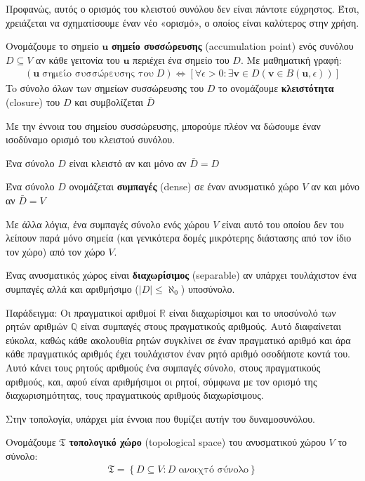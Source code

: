 \documentclass[main.tex]{subfiles}
\begin{document}
	Προφανώς, αυτός ο ορισμός του κλειστού συνόλου δεν είναι πάντοτε εύχρηστος. Έτσι, χρειάζεται να σχηματίσουμε έναν νέο «ορισμό», ο οποίος είναι καλύτερος στην χρήση.
	\begin{definition}
		Ονομάζουμε το σημείο $\boldsymbol{u}$ \textbf{σημείο συσσώρευσης} (accumulation point) ενός συνόλου ${D \subseteq V}$ αν κάθε γειτονία του $\boldsymbol{u}$ περιέχει ένα σημείο του $D$. Με μαθηματική γραφή:
		\begin{align*}
			(\boldsymbol{u}\;\text{σημείο συσσώρευσης του}\;D) \Leftrightarrow [\forall\epsilon>0:\exists\boldsymbol{v}\in D(\boldsymbol{v}\in B(\boldsymbol{u},\epsilon))]
		\end{align*}
		To σύνολο όλων των σημείων συσσώρευσης του $D$ το ονομάζουμε \textbf{κλειστότητα} (closure) του $D$ και συμβολίζεται $\bar{D}$
	\end{definition}
	Με την έννοια του σημείου συσσώρευσης, μπορούμε πλέον να δώσουμε έναν ισοδύναμο ορισμό του κλειστού συνόλου.
	\begin{theorem}
		Ένα σύνολο $D$ είναι κλειστό αν και μόνο αν $\bar{D} = D$
	\end{theorem}
	
	\begin{definition}
		Ένα σύνολο $D$ ονομάζεται \textbf{συμπαγές} (dense) σε έναν ανυσματικό χώρο $V$ αν και μόνο αν ${\bar{D} = V}$
	\end{definition}
	Με άλλα λόγια, ένα συμπαγές σύνολο ενός χώρου $V$ είναι αυτό του οποίου δεν του λείπουν παρά μόνο σημεία (και γενικότερα δομές μικρότερης διάστασης από τον ίδιο τον χώρο) από τον χώρο $V$.
	\begin{definition}
		Ένας ανυσματικός χώρος είναι \textbf{διαχωρίσιμος} (separable) αν υπάρχει τουλάχιστον ένα συμπαγές αλλά και αριθμήσιμο ($|D| \leq \aleph_0$) υποσύνολο.  
	\end{definition}
	Παράδειγμα: Οι πραγματικοί αριθμοί $\mathbb{R}$ είναι διαχωρίσιμοι και το υποσύνολό των ρητών αριθμών $\mathbb{Q}$ είναι συμπαγές στους πραγματικούς αριθμούς. Αυτό διαφαίνεται εύκολα, καθώς κάθε ακολουθία ρητών συγκλίνει σε έναν πραγματικό αριθμό και άρα κάθε πραγματικός αριθμός έχει τουλάχιστον έναν ρητό αριθμό οσοδήποτε κοντά του. Αυτό κάνει τους ρητούς αριθμούς ένα συμπαγές σύνολο, στους πραγματικούς αριθμούς, και, αφού είναι αριθμήσιμοι οι ρητοί, σύμφωνα με τον ορισμό της διαχωρισημότητας, τους πραγματικούς αριθμούς διαχωρίσιμους.
	
	\newpage
	Στην τοπολογία, υπάρχει μία έννοια που θυμίζει αυτήν του δυναμοσυνόλου.
	\begin{definition}
		Ονομάζουμε $\mathfrak{T}$ \textbf{τοπολογικό χώρο} (topological space) του ανυσματικού χώρου $V$ το σύνολο:
		\begin{align*}
			\mathfrak{T} = \left\{D\subseteq V : D \;\text{ανοιχτό σύνολο}\right\}
		\end{align*} 
	\end{definition}
\end{document}
